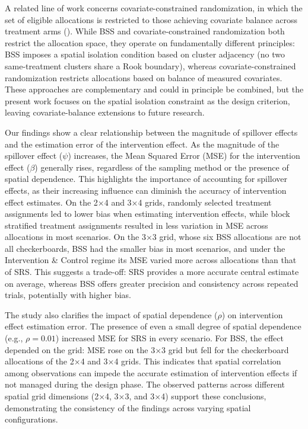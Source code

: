 \documentclass[
  12pt,
  prelim]{bios-prelim}
\begin{document}
A related line of work concerns covariate-constrained randomization, in
which the set of eligible allocations is restricted to those achieving
covariate balance across treatment arms
().
While BSS and covariate-constrained randomization both restrict the
allocation space, they operate on fundamentally different principles:
BSS imposes a spatial isolation condition based on cluster adjacency (no
two same-treatment clusters share a Rook boundary), whereas
covariate-constrained randomization restricts allocations based on
balance of measured covariates. These approaches are complementary and
could in principle be combined, but the present work focuses on the
spatial isolation constraint as the design criterion, leaving
covariate-balance extensions to future research.

Our findings show a clear relationship between the magnitude of
spillover effects and the estimation error of the intervention effect.
As the magnitude of the spillover effect (\(\psi\)) increases, the Mean
Squared Error (MSE) for the intervention effect (\(\beta\)) generally
rises, regardless of the sampling method or the presence of spatial
dependence. This highlights the importance of accounting for spillover
effects, as their increasing influence can diminish the accuracy of
intervention effect estimates. On the 2×4 and 3×4 grids, randomly
selected treatment assignments led to lower bias when estimating
intervention effects, while block stratified treatment assignments
resulted in less variation in MSE across allocations in most scenarios.
On the 3×3 grid, whose six BSS allocations are not all checkerboards,
BSS had the smaller bias in most scenarios, and under the Intervention
\& Control regime its MSE varied more across allocations than that of
SRS. This suggests a trade-off: SRS provides a more accurate central
estimate on average, whereas BSS offers greater precision and
consistency across repeated trials, potentially with higher bias.

The study also clarifies the impact of spatial dependence (\(\rho\)) on
intervention effect estimation error. The presence of even a small
degree of spatial dependence (e.g., \(\rho=0.01\)) increased MSE for SRS
in every scenario. For BSS, the effect depended on the grid: MSE rose on
the 3×3 grid but fell for the checkerboard allocations of the 2×4 and
3×4 grids. This indicates that spatial correlation among observations
can impede the accurate estimation of intervention effects if not
managed during the design phase. The observed patterns across different
spatial grid dimensions (2×4, 3×3, and 3×4) support these conclusions,
demonstrating the consistency of the findings across varying spatial
configurations.
\end{document}
